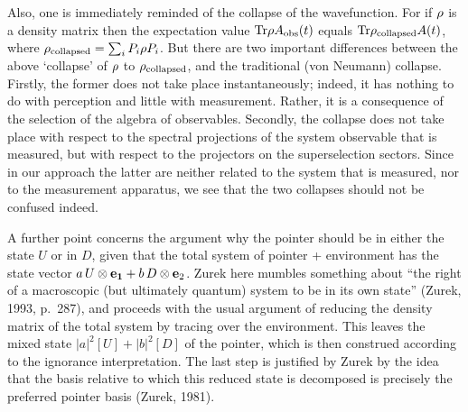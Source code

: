 Also, one is immediately reminded of the collapse of the wavefunction. For if
$\rho$ is a density
matrix then the expectation value ${\rm Tr} \rho A_{\rm obs}(t)$ equals ${\rm
Tr} \rho_{\rm collapsed}
A(t)$, where $\rho_{\rm collapsed}=\sum_i P_i \rho P_i$. But there are two
important differences between
the above `collapse' of $\rho$ to $\rho_{\rm collapsed}$, and the traditional
(von Neumann) collapse.
Firstly, the former does not take place instantaneously; indeed, it has nothing
to do with
perception and little with measurement. Rather, it is a consequence of the
selection of the algebra
of observables. Secondly, the collapse does not take place with respect to the
spectral projections
of the system observable that is measured, but with respect to the projectors
on the superselection
sectors. Since in our approach the latter are neither related to the system
that is measured, nor to
the measurement apparatus, we see that the two collapses should not be confused
indeed.


A further point concerns the argument why the pointer should be in either the
state $U$ or in $D$,
given that the total system of pointer + environment has the state vector $a\,
U\otimes {\bf e_1}+ b\,
D\otimes {\bf e}_2$. Zurek here mumbles something about ``the right of a
macroscopic (but ultimately
quantum) system to be in its own state''  (Zurek, 1993, p.\ 287), and proceeds
with the usual argument
of reducing the density matrix of the total system by tracing over the
environment. This leaves the
mixed state $|a|^2 [U]+|b|^2 [D]$ of the pointer, which is then construed
according to the
ignorance interpretation. The last step is justified by Zurek by the idea that
the basis relative to
which this reduced state is decomposed is precisely the preferred pointer basis
(Zurek, 1981).

